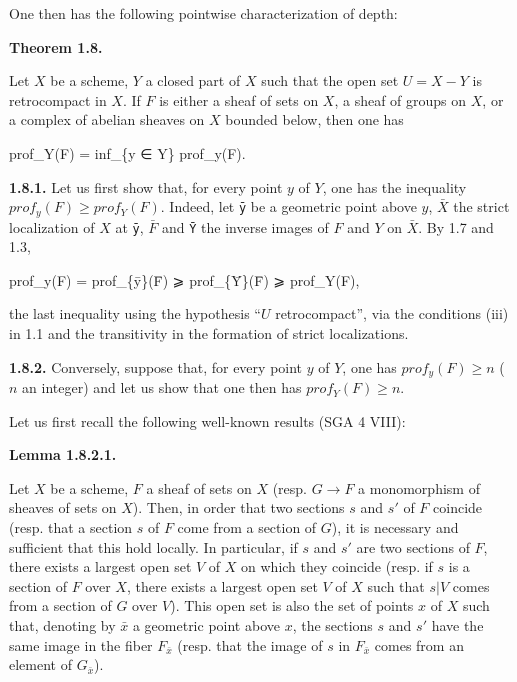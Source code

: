 \documentclass[
  11pt,
  a4paper,
]{book}
\newenvironment{Shaded}{}{}
\newcommand{\NormalTok}[1]{#1}
\begin{document}
One then has the following pointwise characterization of depth:

\textbf{Theorem 1.8.}

Let \(X\) be a scheme, \(Y\) a closed part of \(X\) such that the open
set \(U = X - Y\) is retrocompact in \(X\). If \(F\) is either a sheaf
of sets on \(X\), a sheaf of groups on \(X\), or a complex of abelian
sheaves on \(X\) bounded below, then one has

\begin{Shaded}
\begin{Highlighting}[]
\NormalTok{prof\_Y(F) = inf\_\{y ∈ Y\} prof\_y(F).}
\end{Highlighting}
\end{Shaded}

\textbf{1.8.1.} Let us first show that, for every point \(y\) of \(Y\),
one has the inequality \(prof_{y}(F) \geqslant
prof_{Y}(F)\). Indeed, let \texttt{ȳ} be a geometric point above \(y\),
\(\bar{X}\) the strict localization of \(X\) at \texttt{ȳ}, \(\bar{F}\)
and \texttt{Ȳ} the inverse images of \(F\) and \(Y\) on \(\bar{X}\). By
1.7 and 1.3,

\begin{Shaded}
\begin{Highlighting}[]
\NormalTok{prof\_y(F) = prof\_\{ȳ\}(F̄) ⩾ prof\_\{Ȳ\}(F̄) ⩾ prof\_Y(F),}
\end{Highlighting}
\end{Shaded}

the last inequality using the hypothesis ``\(U\) retrocompact'', via the
conditions (iii) in 1.1 and the transitivity in the formation of strict
localizations.

\textbf{1.8.2.} Conversely, suppose that, for every point \(y\) of
\(Y\), one has \(prof_{y}(F) \geqslant n\) (\(n\) an integer) and let us
show that one then has \(prof_{Y}(F) \geqslant n\).

Let us first recall the following well-known results (SGA 4 VIII):

\textbf{Lemma 1.8.2.1.}

Let \(X\) be a scheme, \(F\) a sheaf of sets on \(X\) (resp. \(G \to F\)
a monomorphism of sheaves of sets on \(X\)). Then, in order that two
sections \(s\) and \(s'\) of \(F\) coincide (resp. that a section \(s\)
of \(F\) come from a section of \(G\)), it is necessary and sufficient
that this hold locally. In particular, if \(s\) and \(s'\) are two
sections of \(F\), there exists a largest open set \(V\) of \(X\) on
which they coincide (resp. if \(s\) is a section of \(F\) over \(X\),
there exists a largest open set \(V\) of \(X\) such that \(s|V\) comes
from a section of \(G\) over \(V\)). This open set is also the set of
points \(x\) of \(X\) such that, denoting by \(\bar{x}\) a geometric
point above \(x\), the sections \(s\) and \(s'\) have the same image in
the fiber \(F_{\bar{x}}\) (resp. that the image of \(s\) in
\(F_{\bar{x}}\) comes from an element of \(G_{\bar{x}}\)).
\end{document}
